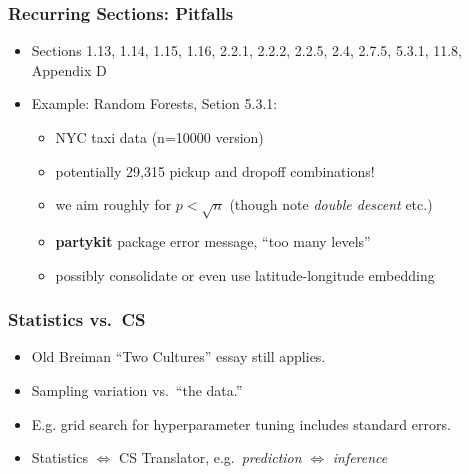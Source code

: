 \documentclass{beamer}
\begin{document}
\begin{frame} 
\frametitle{Recurring Sections: Pitfalls}\pause

\begin{itemize}

\item Sections 1.13, 1.14, 1.15, 1.16, 2.2.1, 2.2.2, 2.2.5, 2.4, 2.7.5,
5.3.1, 11.8, Appendix D

\item Example: Random Forests, Setion 5.3.1: 

   \begin{itemize}
   
   \item NYC taxi data (n=10000 version) 
   
   \item potentially 29,315
   pickup and dropoff combinations! 
   
   \item we aim roughly for $p < \sqrt{n}$ (though note \textit{double
   descent} etc.)
   
   \item \textbf{partykit} package error message, ``too many levels'' 
   
   \item possibly consolidate or even use latitude-longitude embedding
   
   \end{itemize} 

\end{itemize} 

\end{frame} 

\begin{frame} 
\frametitle{Statistics vs.\ CS}\pause

\begin{itemize} 

\item Old Breiman ``Two Cultures'' essay still applies.

\item Sampling variation vs.\ ``the data.''

\item E.g. grid search for hyperparameter tuning includes standard errors.

\item Statistics $\iff$ CS Translator, e.g.\ \textit{prediction}
$\iff$ \textit{inference}

\end{itemize} 

\end{frame}
\end{document}
